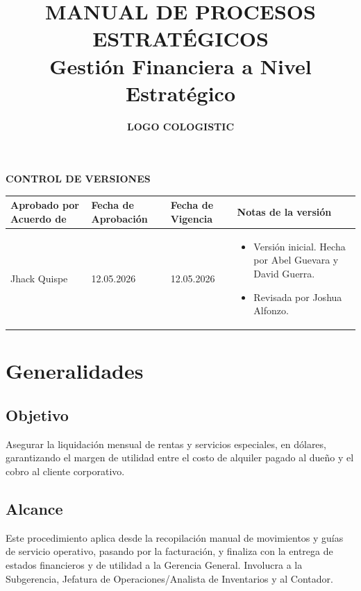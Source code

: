 \documentclass[11pt,letterpaper]{report}
\title{\textbf{\large MANUAL DE PROCESOS ESTRATÉGICOS}\\[0.5em] \textbf{\Huge Gestión Financiera a Nivel Estratégico}}
\author{\textbf{LOGO COLOGISTIC}}
\date{}
\begin{document}
\maketitle

\begin{center}
\textbf{\large CONTROL DE VERSIONES}
\end{center}
\begin{tabularx}{\textwidth}{p{}p{}p{}X}
\toprule
\textbf{Aprobado por Acuerdo de} & \textbf{Fecha de Aprobación} & \textbf{Fecha de Vigencia} & \textbf{Notas de la versión} \\
\midrule
Jhack Quispe & 12.05.2026 & 12.05.2026 & \begin{itemize} \item Versión inicial. Hecha por Abel Guevara y David Guerra. \item Revisada por Joshua Alfonzo. \end{itemize} \\
\bottomrule
\end{tabularx}

\newpage

\tableofcontents

\newpage

\chapter{Generalidades}

\section{Objetivo}
Asegurar la liquidación mensual de rentas y servicios especiales, en dólares, garantizando el margen de utilidad entre el costo de alquiler pagado al dueño y el cobro al cliente corporativo.

\section{Alcance}
Este procedimiento aplica desde la recopilación manual de movimientos y guías de servicio operativo, pasando por la facturación, y finaliza con la entrega de estados financieros y de utilidad a la Gerencia General. Involucra a la Subgerencia, Jefatura de Operaciones/Analista de Inventarios y al Contador.
\end{document}
